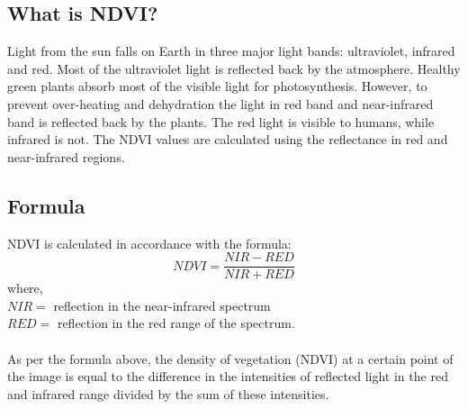 \documentclass[12pt, a4paper]{report}
\begin{document}
\subsection{What is NDVI?}
Light from the sun falls on Earth in three major light bands: ultraviolet, infrared and red. Most of the ultraviolet light is reflected back by the atmosphere. Healthy green plants absorb most of the visible light for photosynthesis. However, to prevent over-heating and dehydration the light in red band and near-infrared band is reflected back by the plants. The red light is visible to humans, while infrared is not. The NDVI values are calculated using the reflectance in red and near-infrared regions.
\subsection{Formula}
NDVI is calculated in accordance with the formula:
\begin{displaymath}
NDVI=\frac{NIR-RED}{NIR+RED}
\end{displaymath}
where,\\
$NIR=$ reflection in the near-infrared spectrum\\
$RED=$ reflection in the red range of the spectrum.
\paragraph{}
As per the formula above, the density of vegetation (NDVI) at a certain point of the image is equal to the difference in the intensities of reflected light in the red and infrared range divided by the sum of these intensities.
\end{document}
